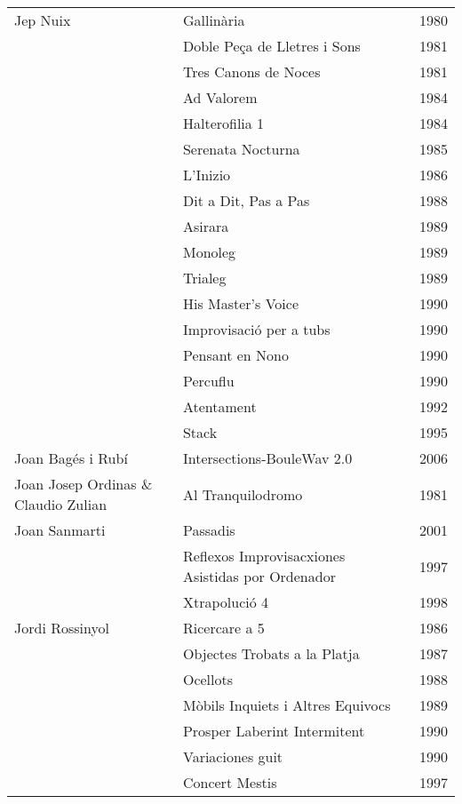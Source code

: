 \begin{center}
\begin{longtable}{ p{}  p{}  p{} }
Jep Nuix & Gallinària & 1980 \\ \cmidrule (r){2-3} 
& Doble Peça de Lletres i Sons & 1981 \\ \cmidrule (r){2-3} 
& Tres Canons de Noces & 1981 \\ \cmidrule (r){2-3} 
& Ad Valorem & 1984 \\ \cmidrule (r){2-3} 
& Halterofilia 1 & 1984 \\ \cmidrule (r){2-3} 
& Serenata Nocturna & 1985 \\ \cmidrule (r){2-3} 
& L'Inizio & 1986 \\ \cmidrule (r){2-3} 
& Dit a Dit, Pas a Pas & 1988 \\ \cmidrule (r){2-3} 
& Asirara & 1989 \\ \cmidrule (r){2-3} 
& Monoleg & 1989 \\ \cmidrule (r){2-3} 
& Trialeg & 1989 \\ \cmidrule (r){2-3} 
& His Master's Voice & 1990 \\ \cmidrule (r){2-3} 
& Improvisació per a tubs & 1990 \\ \cmidrule (r){2-3} 
& Pensant en Nono & 1990 \\ \cmidrule (r){2-3} 
& Percuflu & 1990 \\ \cmidrule (r){2-3} 
& Atentament & 1992 \\ \cmidrule (r){2-3} 
& Stack & 1995 \\ \midrule 
Joan Bagés i Rubí & Intersections-BouleWav 2.0 & 2006 \\ \midrule 
Joan Josep Ordinas \& Claudio Zulian & Al Tranquilodromo & 1981 \\ \midrule 
Joan Sanmarti & Passadis & 2001 \\ \cmidrule (r){2-3} 
& Reflexos Improvisacxiones Asistidas por Ordenador & 1997 \\ \cmidrule (r){2-3} 
& Xtrapolució 4 & 1998 \\ \midrule 
Jordi Rossinyol & Ricercare a 5 & 1986 \\ \cmidrule (r){2-3} 
& Objectes Trobats a la Platja & 1987 \\ \cmidrule (r){2-3} 
& Ocellots & 1988 \\ \cmidrule (r){2-3} 
& Mòbils Inquiets i Altres Equivocs & 1989 \\ \cmidrule (r){2-3} 
& Prosper Laberint Intermitent & 1990 \\ \cmidrule (r){2-3} 
& Variaciones guit & 1990 \\ \cmidrule (r){2-3} 
& Concert Mestis & 1997 \\ \cmidrule (r){2-3} 

\end{longtable}
\end{center}
